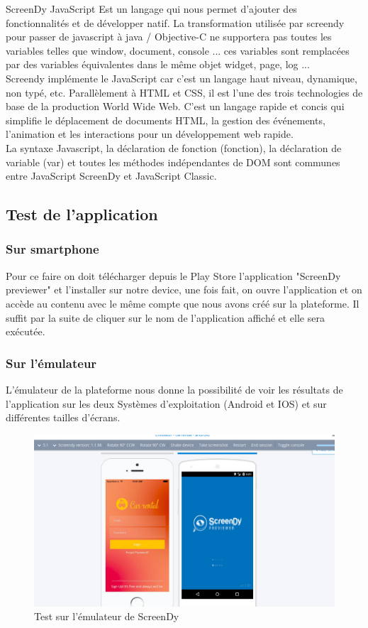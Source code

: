 \documentclass[12pt,a4paper]{report}
\begin{document}
ScreenDy JavaScript Est un langage qui nous permet d'ajouter des fonctionnalités et de développer natif. La transformation utilisée par screendy pour passer de javascript à java / Objective-C ne supportera pas toutes les variables telles que window, document, console ... ces variables sont remplacées par des variables équivalentes dans le même objet widget, page, log ...\\
Screendy implémente le JavaScript car c'est un langage haut niveau, dynamique, non typé, etc. Parallèlement à HTML et CSS, il est l'une des trois technologies de base de la production World Wide Web. C'est un langage rapide et concis qui simplifie le déplacement de documents HTML, la gestion des événements, l'animation et les interactions pour un développement web rapide.\\
La syntaxe Javascript, la déclaration de fonction (fonction), la déclaration de variable (var) et toutes les méthodes indépendantes de DOM sont communes entre JavaScript ScreenDy et JavaScript Classic.



		\subsection{Test de l'application}
			\subsubsection{Sur smartphone}
Pour ce faire on doit télécharger depuis le Play Store l'application "ScreenDy previewer" et l'installer sur notre device, une fois fait,  on ouvre l'application et on accède au contenu avec le même compte que nous avons créé sur la plateforme. Il suffit par la suite de cliquer sur le nom de l'application affiché et elle sera exécutée.
			\subsubsection{Sur l'émulateur}
L'émulateur de la plateforme nous donne la possibilité de voir les résultats de l'application sur les deux Systèmes d'exploitation (Android et IOS) et sur différentes tailles d'écrans.
			\begin{figure}[!hbtp]
			\centering
			\includegraphics[scale=0.3]{./graphics/emul.png}
			\caption{Test sur l'émulateur de ScreenDy}
			\end{figure}
\end{document}
